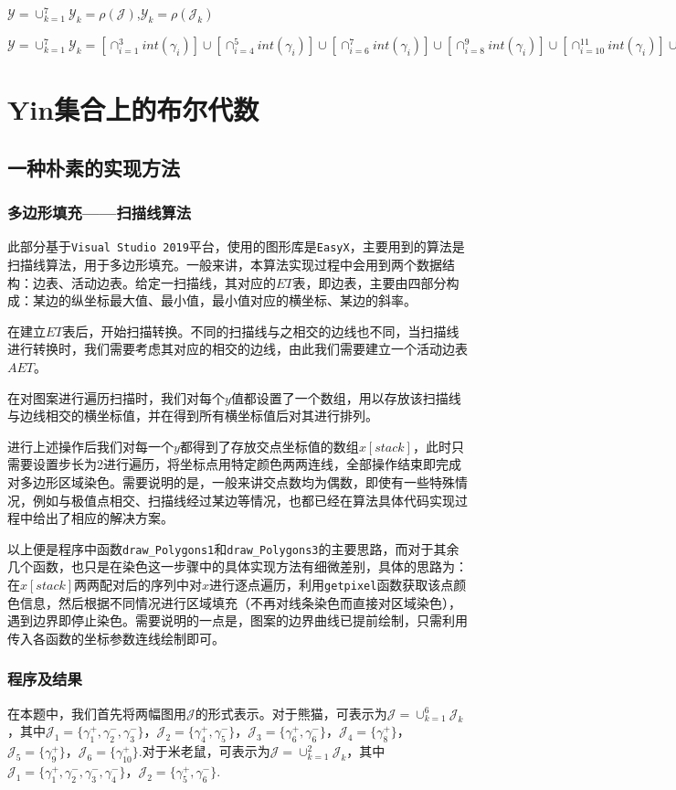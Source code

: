 \documentclass{article}
\begin{document}
		$\mathcal{Y}=\cup_{k=1}^{7}\mathcal{Y}_k=\rho(\mathcal{J})$,$\mathcal{Y}_k=\rho(\mathcal{J}_k)$
		
		$\mathcal{Y}=\cup_{k=1}^7\mathcal{Y}_k=[\cap_{i=1}^{3}int(\gamma_{i})]\cup[\cap_{i=4}^{5}int(\gamma_{i})]\cup[\cap_{i=6}^{7}int(\gamma_{i})]\cup[\cap_{i=8}^{9}int(\gamma_{i})]\cup[\cap_{i=10}^{11}int(\gamma_{i})]\cup int(\gamma_{12}) \cup int(\gamma_{13})$
	
		
	\newpage
	\section{Yin集合上的布尔代数}
	\subsection{一种朴素的实现方法}
	\subsubsection{多边形填充——扫描线算法}
	此部分基于\verb|Visual Studio 2019|平台，使用的图形库是\verb|EasyX|，主要用到的算法是扫描线算法，用于多边形填充。一般来讲，本算法实现过程中会用到两个数据结构：边表、活动边表。给定一扫描线，其对应的$ET$表，即边表，主要由四部分构成：某边的纵坐标最大值、最小值，最小值对应的横坐标、某边的斜率。
	
	
	在建立$ET$表后，开始扫描转换。不同的扫描线与之相交的边线也不同，当扫描线进行转换时，我们需要考虑其对应的相交的边线，由此我们需要建立一个活动边表$AET$。
	
	在对图案进行遍历扫描时，我们对每个$y$值都设置了一个数组，用以存放该扫描线与边线相交的横坐标值，并在得到所有横坐标值后对其进行排列。
	
	进行上述操作后我们对每一个$y$都得到了存放交点坐标值的数组$x[stack]$，此时只需要设置步长为2进行遍历，将坐标点用特定颜色两两连线，全部操作结束即完成对多边形区域染色。需要说明的是，一般来讲交点数均为偶数，即使有一些特殊情况，例如与极值点相交、扫描线经过某边等情况，也都已经在算法具体代码实现过程中给出了相应的解决方案。
	
	以上便是程序中函数\verb|draw_Polygons1|和\verb|draw_Polygons3|的主要思路，而对于其余几个函数，也只是在染色这一步骤中的具体实现方法有细微差别，具体的思路为：在$x[stack]$两两配对后的序列中对$x$进行逐点遍历，利用\verb|getpixel|函数获取该点颜色信息，然后根据不同情况进行区域填充（不再对线条染色而直接对区域染色），遇到边界即停止染色。需要说明的一点是，图案的边界曲线已提前绘制，只需利用传入各函数的坐标参数连线绘制即可。
	
		
	\subsubsection{程序及结果}
	在本题中，我们首先将两幅图用$\mathcal{J}$的形式表示。对于熊猫，可表示为$\mathcal{J}=\cup_{k=1}^{6}\mathcal{J}_k$，其中$\mathcal{J}_1=\{\gamma_{1}^+,\gamma_{2}^-,\gamma_{3}^-\}$，$\mathcal{J}_2=\{\gamma_4^+,\gamma_5^-\}$，$\mathcal{J}_3=\{\gamma_6^+,\gamma_6^-\}$，$\mathcal{J}_4=\{\gamma_8^+\}$，$\mathcal{J}_5=\{\gamma_9^+\}$，$\mathcal{J}_6=\{\gamma_{10}^+\}$.对于米老鼠，可表示为$\mathcal{J}=\cup_{k=1}^{2}\mathcal{J}_k$，其中$\mathcal{J}_1=\{\gamma_{1}^+,\gamma_{2}^-,\gamma_{3}^-,\gamma_{4}^-\}$，$\mathcal{J}_2=\{\gamma_5^+,\gamma_6^-\}$.
	
\end{document}
